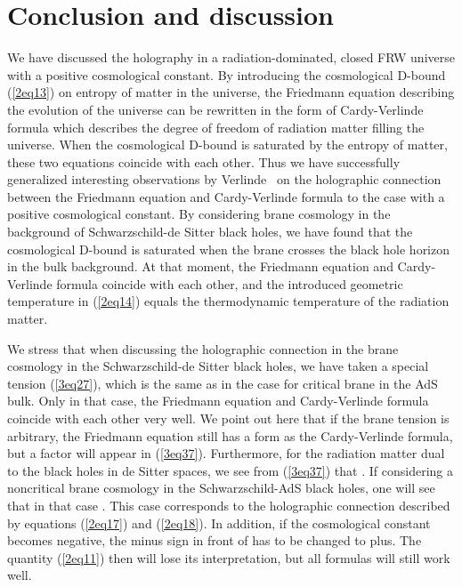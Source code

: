 \documentclass[a4paper,12pt]{article}
\begin{document}
\section{Conclusion and discussion}

We  have discussed the holography in a radiation-dominated, closed
FRW universe with a positive cosmological constant. By introducing the
cosmological D-bound (\ref{2eq13}) on entropy of matter in the universe,
the Friedmann equation describing the evolution of the universe can be 
rewritten in the form of Cardy-Verlinde formula which describes the degree
of freedom of radiation matter filling the universe. When the cosmological
D-bound is saturated by the entropy of matter, these two equations coincide
with each other. Thus we have successfully generalized  
interesting observations by Verlinde~\cite{Verl,SV} on the holographic 
connection between the Friedmann equation and Cardy-Verlinde formula
to the case with a positive cosmological constant. By considering brane 
cosmology in the background of Schwarzschild-de Sitter black holes, we have 
found that the cosmological D-bound is saturated when the brane crosses 
the black hole horizon in the bulk background. At that moment, the Friedmann
equation and Cardy-Verlinde formula coincide with each other, and the 
introduced geometric temperature \coordHE{} in (\ref{2eq14}) equals  the 
thermodynamic temperature \coordHE{} of the radiation matter.

We stress that when discussing the holographic connection in the brane cosmology 
in the Schwarzschild-de Sitter black holes, we have taken a special 
tension (\ref{3eq27}), which is the same as in the case for critical brane 
in the AdS bulk. Only in that case, the Friedmann equation and Cardy-Verlinde
formula coincide with each other very well. We point out here that if the brane 
tension is arbitrary, the Friedmann equation still has a  form as the
Cardy-Verlinde formula,  but a factor \coordHE{} will
appear in (\ref{3eq37}). Furthermore, for the radiation matter dual to the black holes
in de Sitter spaces, we see from (\ref{3eq37}) that \coordHE{}. If 
 considering a noncritical brane cosmology in the Schwarzschild-AdS black holes,  
 one will see that in that case \coordHE{}. This case corresponds to the 
holographic connection described by equations (\ref{2eq17}) and (\ref{2eq18}).
In addition, if the cosmological constant becomes negative, the minus sign in front of
\coordHE{} has to be changed to plus. The quantity (\ref{2eq11})
then will lose its interpretation, but all formulas will still work well.
\end{document}
